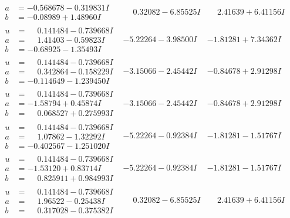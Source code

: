 \documentclass[1p]{elsarticle_modified}
\theoremstyle{definition}
\begin{document}
$$\begin{array}{c|c|c}
\begin{aligned}
a &= -0.568678 - 0.319831 I \\
b &= -0.08989 + 1.48960 I\end{aligned}
 & \phantom{-}0.32082 - 6.85525 I & \phantom{-}2.41639 + 6.41156 I \\ \hline\begin{aligned}
u &= \phantom{-}0.141484 - 0.739668 I \\
a &= \phantom{-}1.41403 - 0.59823 I \\
b &= -0.68925 - 1.35493 I\end{aligned}
 & -5.22264 - 3.98500 I & -1.81281 + 7.34362 I \\ \hline\begin{aligned}
u &= \phantom{-}0.141484 - 0.739668 I \\
a &= \phantom{-}0.342864 - 0.158229 I \\
b &= -0.114649 - 1.239450 I\end{aligned}
 & -3.15066 - 2.45442 I & -0.84678 + 2.91298 I \\ \hline\begin{aligned}
u &= \phantom{-}0.141484 - 0.739668 I \\
a &= -1.58794 + 0.45874 I \\
b &= \phantom{-}0.068527 + 0.275993 I\end{aligned}
 & -3.15066 - 2.45442 I & -0.84678 + 2.91298 I \\ \hline\begin{aligned}
u &= \phantom{-}0.141484 - 0.739668 I \\
a &= \phantom{-}1.07862 - 1.32292 I \\
b &= -0.402567 - 1.251020 I\end{aligned}
 & -5.22264 - 0.92384 I & -1.81281 - 1.51767 I \\ \hline\begin{aligned}
u &= \phantom{-}0.141484 - 0.739668 I \\
a &= -1.53120 + 0.83714 I \\
b &= \phantom{-}0.825911 + 0.984993 I\end{aligned}
 & -5.22264 - 0.92384 I & -1.81281 - 1.51767 I \\ \hline\begin{aligned}
u &= \phantom{-}0.141484 - 0.739668 I \\
a &= \phantom{-}1.96522 - 0.25438 I \\
b &= \phantom{-}0.317028 - 0.375382 I\end{aligned}
 & \phantom{-}0.32082 - 6.85525 I & \phantom{-}2.41639 + 6.41156 I \\ \hline\begin{aligned}

\end{aligned}
\end{array}$$
\end{document}
